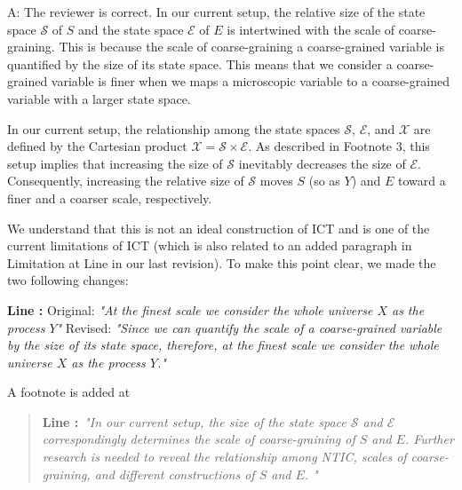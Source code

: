 \documentclass[utf8]{article}
\newenvironment{ans}  
    {\color{Black}\noindent A:}
    {~\newline}
\newcommand{\revise}[3]{
	\newline
	\newline
    \noindent
    \textbf{Line #1:}
    \newline
    Original:\newline
    \textit{"#2"}
    \newline
    \newline
    Revised:\newline
    \textit{"#3"}\newline}
\newcommand{\addnew}[2]{\blockcquote{}{\textbf{Line #1:}~\newline\textit{"#2"}}
}
\begin{document}
    	\begin{ans}
    		The reviewer is correct. In our current setup, the relative size of the state space $\mathcal{S}$ of $S$ and the state space $\mathcal{E}$ of $E$ is intertwined with the scale of coarse-graining. This is because the scale of coarse-graining a coarse-grained variable is quantified by the size of its state space. This means that we consider a coarse-grained variable is finer when we maps a microscopic variable to a coarse-grained variable with a larger state space.  
    		
    		In our current setup, the relationship among the state spaces $\mathcal{S}$,  $\mathcal{E}$, and  $\mathcal{X}$ are defined by the Cartesian product $\mathcal{X}=\mathcal{S}\times\mathcal{E}$. As described in Footnote 3, this setup implies that increasing the size of $\mathcal{S}$ inevitably decreases the size of $\mathcal{E}$. Consequently, increasing the relative size of $\mathcal{S}$ moves $S$ (so as $Y$) and $E$ toward a finer and a coarser scale, respectively. 
    		
    		We understand that this is not an ideal construction of ICT and is one of the current limitations of ICT (which is also related to an added paragraph in Limitation at Line  in our last revision). To make this point clear, we made the two following changes:    		    	
    		\revise{}
    		{At the finest scale we consider the whole universe $X$ as the process $Y$}
    		{Since we can quantify the scale of a coarse-grained variable by the size of its state space, therefore, at the finest scale we consider the whole universe $X$ as the process $Y$.}  

    		 		
    		\noindent
    		A footnote is added at
    		\addnew{}{In our current setup, the size of the state space $\mathcal{S}$ and $\mathcal{E}$ correspondingly determines the scale of coarse-graining of $S$ and $E$. Further research is needed to reveal the relationship among NTIC, scales of coarse-graining, and different constructions of $S$ and $E$. 
    		}
    		
    		
    		
%    		
%    		
%    		
%    		
    		

\end{ans}
\end{document}
